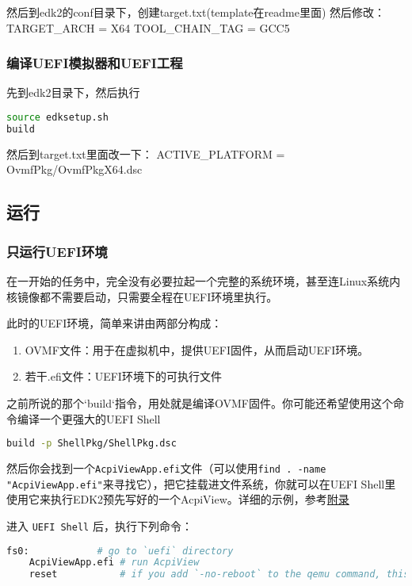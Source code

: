 然后到edk2的conf目录下，创建target.txt(template在readme里面)
然后修改：
TARGET\_ARCH           = X64
TOOL\_CHAIN\_TAG        = GCC5

\subsubsection{编译UEFI模拟器和UEFI工程}
先到edk2目录下，然后执行
\begin{lstlisting}[language=bash]
source edksetup.sh
build
\end{lstlisting}

然后到target.txt里面改一下：
ACTIVE\_PLATFORM       = OvmfPkg/OvmfPkgX64.dsc

\subsection{运行}

\label{run-edk2}

\subsubsection{只运行UEFI环境}
在一开始的任务中，完全没有必要拉起一个完整的系统环境，甚至连Linux系统内核镜像都不需要启动，只需要全程在UEFI环境里执行。

此时的UEFI环境，简单来讲由两部分构成：
\begin{enumerate}
	\item OVMF文件：用于在虚拟机中，提供UEFI固件，从而启动UEFI环境。
	\item 若干.efi文件：UEFI环境下的可执行文件
\end{enumerate}

之前所说的那个`build`指令，用处就是编译OVMF固件。你可能还希望使用这个命令编译一个更强大的UEFI Shell
\begin{lstlisting}[language=bash]
build -p ShellPkg/ShellPkg.dsc
\end{lstlisting}

然后你会找到一个\texttt{AcpiViewApp.efi}文件（可以使用\texttt{find . -name "AcpiViewApp.efi"}来寻找它），把它挂载进文件系统，你就可以在UEFI Shell里使用它来执行EDK2预先写好的一个AcpiView。详细的示例，参考\hyperref[appendix:launchuefi]{附录}

进入 \texttt{UEFI Shell} 后，执行下列命令：

\begin{lstlisting}[language=bash]
    fs0:            # go to `uefi` directory
    AcpiViewApp.efi # run AcpiView
    reset           # if you add `-no-reboot` to the qemu command, this will exit the UEFI Shell
\end{lstlisting}



